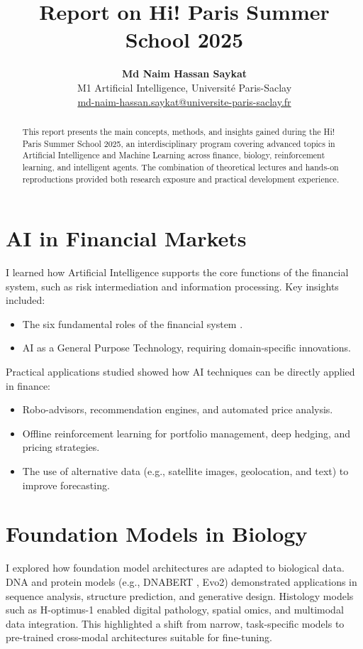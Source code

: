 \documentclass[11pt,a4paper]{article}
\title{\textbf{Report on Hi! Paris Summer School 2025}}
\author{\textbf{Md Naim Hassan Saykat}\\
M1 Artificial Intelligence, Université Paris-Saclay\\
\href{mailto:md-naim-hassan.saykat@universite-paris-saclay.fr}{md-naim-hassan.saykat@universite-paris-saclay.fr}}
\date{}
\begin{document}
\maketitle

\begin{abstract}
This report presents the main concepts, methods, and insights gained during the Hi! Paris Summer School 2025, an interdisciplinary program covering advanced topics in Artificial Intelligence and Machine Learning across finance, biology, reinforcement learning, and intelligent agents. The combination of theoretical lectures and hands-on reproductions provided both research exposure and practical development experience.
\end{abstract}

\section{AI in Financial Markets}
I learned how Artificial Intelligence supports the core functions of the financial system, such as risk intermediation and information processing.  
Key insights included:
\begin{itemize}
    \item The six fundamental roles of the financial system \cite{merton1995}.   
    \item AI as a General Purpose Technology, requiring domain-specific innovations.  
\end{itemize}

Practical applications studied showed how AI techniques can be directly applied in finance:
\begin{itemize}
    \item Robo-advisors, recommendation engines, and automated price analysis.  
    \item Offline reinforcement learning for portfolio management, deep hedging, and pricing strategies.  
    \item The use of alternative data (e.g., satellite images, geolocation, and text) to improve forecasting.  
\end{itemize}

\section{Foundation Models in Biology}
I explored how foundation model architectures are adapted to biological data.  
DNA and protein models (e.g., DNABERT \cite{ji2021dnabert}, Evo2) demonstrated applications in sequence analysis, structure prediction, and generative design.  
Histology models such as H-optimus-1 enabled digital pathology, spatial omics, and multimodal data integration.  
This highlighted a shift from narrow, task-specific models to pre-trained cross-modal architectures suitable for fine-tuning.
\end{document}
